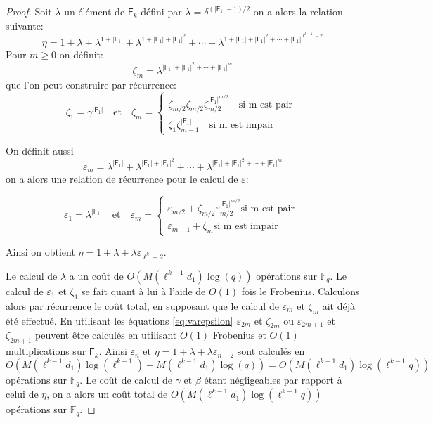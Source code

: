 \documentclass[10pt,a4paper]{book}
\theoremstyle{plain}
\theoremstyle{definition}
\theoremstyle{definition}
\theoremstyle{definition}
\theoremstyle{definition}
\theoremstyle{definition}
\theoremstyle{remark}
\theoremstyle{remark}
\theoremstyle{definition}
\begin{document}
\begin{proof}
Soit $\lambda$ un élément de $\mathsf{F}_k$ défini par $\lambda = \delta^{(|\mathsf{F}_1|-1)/2} $ on a alors la relation suivante:
\begin{equation*}
\eta = 1 + \lambda + \lambda^{1+|\mathsf{F}_1|} + \lambda^{1+|\mathsf{F}_1|+|\mathsf{F}_1|^{2}} + \cdots + \lambda^{1+|\mathsf{F}_1|+|\mathsf{F}_1|^{2}+\cdots+|\mathsf{F}_1|^{\ell^{k-1}-2}} 
\end{equation*}
Pour $m \geqslant 0$ on définit:
\begin{equation}
\zeta_m=\lambda^{|\mathsf{F}_1|+|\mathsf{F}_1|^2+\cdots+|\mathsf{F}_1|^{m}} 
\end{equation}
que l'on peut construire par récurrence:
\begin{equation*}
\zeta_1=\gamma^{|\mathsf{F}_1|} \quad \text{et} \quad
\zeta_m=
\begin{cases} 
\zeta_{m/2}  \zeta_{m/2}\zeta_{m/2}^{|\mathsf{F}_1|^{m/2}} \quad \text{si m est pair }\\
\zeta_{1}  \zeta_{m-1}^{|\mathsf{F}_1|} \quad \text{si m est impair}
\end{cases}
\end{equation*}

On définit aussi
\begin{equation*}
\varepsilon_m=\lambda^{|\mathsf{F}_1|} + \lambda^{|\mathsf{F}_1|+|\mathsf{F}_1|^{2}} + \cdots + \lambda^{|\mathsf{F}_1|+|\mathsf{F}_1|^{2}+\cdots+|\mathsf{F}_1|^{m}}
\end{equation*} 
on a alors une relation de récurrence pour le calcul de $\varepsilon$:

\begin{equation}
\label{eq:varepsilon}
\varepsilon_1=\lambda^{|\mathsf{F}_1|} \quad \text{et} \quad
\varepsilon_m=
\begin{cases} 
\varepsilon_{m/2} + \zeta_{m/2}\varepsilon_{m/2}^{|\mathsf{F}_1|^{m/2}} \text{si m est pair }\\
\varepsilon_{m-1} + \zeta_{m} \text{si m est impair}
\end{cases}
\end{equation}

Ainsi on obtient $\eta=1+\lambda+\lambda \varepsilon_{\ell^k-2}$. 

 
Le calcul de $\lambda$ a un coût de $O(M(\ell^{k-1}d_1)\log(q))$ opérations sur $\mathbb{F}_q$. Le calcul de $\varepsilon_1$ et $\zeta_1$ se fait quant à lui à l'aide de $O(1)$ fois le Frobenius. Calculons alors par récurrence le coût total, en supposant que le calcul de $\varepsilon_m$ et $\zeta_m$ ait déjà été effectué. En utilisant les équations \eqref{eq:varepsilon} $\varepsilon_{2m}$ et $\zeta_{2m}$ ou $\varepsilon_{2m+1}$ et $\zeta_{2m+1}$ peuvent être calculés en utilisant $O(1)$ Frobenius et $O(1)$ multiplications sur $\mathsf{F}_{k}$. Ainsi $\varepsilon_n$ et $\eta=1+\lambda+\lambda\varepsilon_{n-2}$ sont calculés en $O(M(\ell^{k-1}d_1)\log(\ell^{k-1})+M(\ell^{k-1}d_1)\log(q))=O(M(\ell^{k-1}d_1)\log(\ell^{k-1}q))$ opérations sur $\mathbb{F}_q$.
Le coût de calcul de $\gamma$ et $\beta$ étant négligeables par rapport à celui de $\eta$, on a alors un coût total de $O(M(\ell^{k-1}d_1)\log(\ell^{k-1}q))$ opérations sur $\mathbb{F}_q$.

\end{proof}
\end{document}
